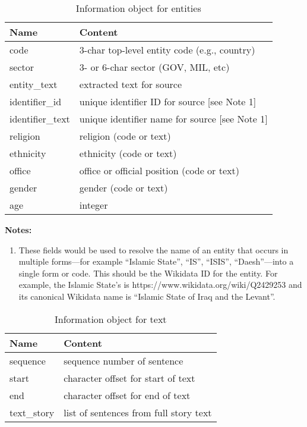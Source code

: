 \documentclass[11pt]{report}
\begin{document}
\begin{table}[htp]
\caption{Information object for entities }
\begin{center}
\begin{tabular}{|l|l|}
\hline
Name & Content \\
\hline
code & 3-char top-level entity code (e.g., country)\\
sector & 3- or 6-char sector (GOV, MIL, etc)\\
entity\_text & extracted text for source \\
identifier\_id & unique identifier ID for source [see Note 1]\\
identifier\_text & unique identifier name for source [see Note 1]\\
religion & religion (code or text) \\
ethnicity & ethnicity (code or text) \\
office & office or official position (code or text) \\
gender & gender (code or text) \\
age & integer \\
\hline
\end{tabular}
\end{center}
\label{tab:actorinfo}
\noindent \textbf{Notes:}
\begin{enumerate}
\item These fields would be used to resolve the name of an entity that occurs in multiple forms---for example ``Islamic State'', ``IS'', ``ISIS'', ``Daesh''---into a single form or code. This should be the Wikidata ID for the entity. For example, the Islamic State's is https://www.wikidata.org/wiki/Q2429253 and its canonical Wikidata name is ``Islamic State of Iraq and the Levant''.
\end{enumerate}
\end{table}%

\begin{table}[htp]
\caption{Information object for text }
\begin{center}
\begin{tabular}{|l|l|}
\hline
Name & Content \\
\hline
sequence & sequence number of sentence \\
start & character offset for start of text  \\
end &  character offset for end of text   \\
text\_story & list of sentences from full story text \\
\hline
\end{tabular}
\end{center}
\label{tab:textinfo}
\end{table}%
\end{document}
